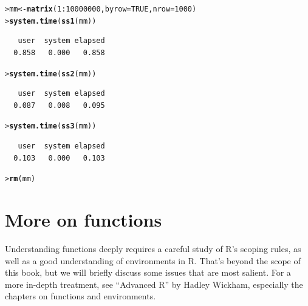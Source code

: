 \documentclass[12pt,oneside]{book}\usepackage[]{graphicx}\usepackage[]{color}
\makeatletter
\newcommand{\hlnum}[1]{\textcolor[rgb]{0.686,0.059,0.569}{#1}}%
\newcommand{\hlopt}[1]{\textcolor[rgb]{0,0,0}{#1}}%
\newcommand{\hlstd}[1]{\textcolor[rgb]{0.345,0.345,0.345}{#1}}%
\newcommand{\hlkwb}[1]{\textcolor[rgb]{0.69,0.353,0.396}{#1}}%
\newcommand{\hlkwc}[1]{\textcolor[rgb]{0.333,0.667,0.333}{#1}}%
\newcommand{\hlkwd}[1]{\textcolor[rgb]{0.737,0.353,0.396}{\textbf{#1}}}%
\newenvironment{kframe}{%
 \def\at@end@of@kframe{}%
 \ifinner\ifhmode%
  \def\at@end@of@kframe{\end{minipage}}%
  \begin{minipage}{\columnwidth}%
 \fi\fi%
 \def\FrameCommand##1{\hskip\@totalleftmargin \hskip-\fboxsep
 \colorbox{shadecolor}{##1}\hskip-\fboxsep
     \hskip-\linewidth \hskip-\@totalleftmargin \hskip\columnwidth}%
 \MakeFramed {\advance\hsize-\width
   \@totalleftmargin\z@ \linewidth\hsize
   \@setminipage}}%
 {\par\unskip\endMakeFramed%
 \at@end@of@kframe}
\newenvironment{knitrout}{}{} %
\makeatother
\begin{document}
\begin{knitrout}
\color{fgcolor}\begin{kframe}
\begin{alltt}
\hlstd{> }\hlstd{mm} \hlkwb{<-} \hlkwd{matrix}\hlstd{(}\hlnum{1}\hlopt{:}\hlnum{10000000}\hlstd{,} \hlkwc{byrow} \hlstd{=} \hlnum{TRUE}\hlstd{,} \hlkwc{nrow} \hlstd{=} \hlnum{1000}\hlstd{)}
\hlstd{> }\hlkwd{system.time}\hlstd{(}\hlkwd{ss1}\hlstd{(mm))}
\end{alltt}
\begin{verbatim}
   user  system elapsed 
  0.858   0.000   0.858 
\end{verbatim}
\begin{alltt}
\hlstd{> }\hlkwd{system.time}\hlstd{(}\hlkwd{ss2}\hlstd{(mm))}
\end{alltt}
\begin{verbatim}
   user  system elapsed 
  0.087   0.008   0.095 
\end{verbatim}
\begin{alltt}
\hlstd{> }\hlkwd{system.time}\hlstd{(}\hlkwd{ss3}\hlstd{(mm))}
\end{alltt}
\begin{verbatim}
   user  system elapsed 
  0.103   0.000   0.103 
\end{verbatim}
\begin{alltt}
\hlstd{> }\hlkwd{rm}\hlstd{(mm)}
\end{alltt}
\end{kframe}
\end{knitrout}

\section{More on functions}
Understanding functions deeply requires a careful study of R's scoping rules, as well as a good understanding of environments in R. That's beyond the scope of this book, but we will briefly discuss some issues that are most salient. For a more in-depth treatment, see ``Advanced R'' by Hadley Wickham, especially the chapters on functions and environments. 
\end{document}
